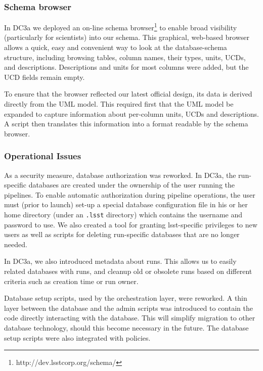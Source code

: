 \subsubsection{Schema browser}

In DC3a we deployed an on-line schema
browser\footnote{http://dev.lsstcorp.org/schema/} to enable broad
visibility (particularly for scientists) into our schema.  This
graphical, web-based browser allows a quick, easy and convenient way
to look at the database-schema structure, including browsing tables,
column names, their types, units, UCDs, and descriptions.
Descriptions and units for most columns were added, but the UCD fields
remain empty.

To ensure that the browser reflected our latest official design, its
data is derived directly from the UML model.  This required first that
the UML model be expanded to capture information about per-column
units, UCDs and descriptions.  A script then translates this
information into a format readable by the schema browser.  

\subsubsection{Operational Issues}

As a security measure, database authorization was reworked.  In DC3a,
the run-specific databases are created under the ownership of the user
running the pipelines.  To enable automatic authorization during
pipeline operations, the user must (prior to launch) set-up a special
database configuration file in his or her home directory (under an
{\tt .lsst} directory) which contains the username and password to
use.  We also created a tool for granting lsst-specific privileges to
new users as well as scripts for deleting run-specific databases that
are no longer needed.

In DC3a, we also introduced metadata about runs. This allows us to
easily related databases with runs, and cleanup old or obsolete runs
based on different criteria such as creation time or run owner.

Database setup scripts, used by the orchestration layer, were
reworked. A thin layer between the database and the admin scripts was
introduced to contain the code directly interacting with the
database. This will simplify migration to other database technology,
should this become necessary in the future.  The database setup scripts
were also integrated with policies.




